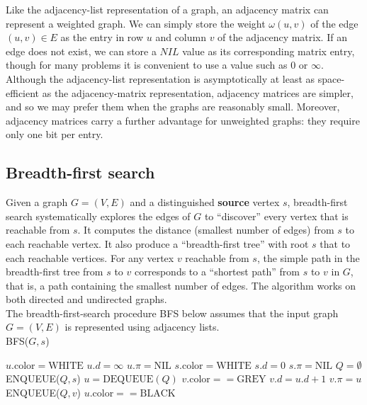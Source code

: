\documentclass[12pt]{article}
\begin{document}
Like the adjacency-list representation of a graph, an adjacency matrix can represent a weighted graph. We can simply store the weight $\omega(u,v)$ of the edge $(u,v) \in E$ as the entry in row $u$ and column $v$ of the adjacency matrix. If an edge does not exist, we can store a $NIL$ value as its corresponding matrix entry, though for many problems it is convenient to use a value such as $0$ or $\infty$. \\

Although the adjacency-list representation is asymptotically at least as space-efficient as the adjacency-matrix representation, adjacency matrices are simpler, and so we may prefer them when the graphs are reasonably small. Moreover, adjacency matrices carry a further advantage for unweighted graphs: they require only one bit per entry.

\subsection{Breadth-first search}

Given a graph $G = (V,E)$ and a distinguished \textbf{source} vertex $s$, breadth-first search systematically explores the edges of $G$ to ``discover'' every vertex that is reachable from $s$. It computes the distance (smallest number of edges) from $s$ to each reachable vertex. It also produce a ``breadth-first tree'' with root $s$ that to each reachable vertices. For any vertex $v$ reachable from $s$, the simple path in the breadth-first tree from $s$ to $v$ corresponds to a ``shortest path'' from $s$ to $v$ in $G$, that is, a path containing the smallest number of edges. The algorithm works on both directed and undirected graphs. \\

The breadth-first-search procedure BFS below assumes that the input graph $G = (V,E)$ is represented using adjacency lists. \\

BFS($G, s$)
\begin{algorithmic}[1]
	\State $u.\text{color} = \text{WHITE}$
	\State $u.d = \infty$
	\State $u.\pi = \text{NIL}$
\EndFor
\State $s.\text{color} = \text{WHITE}$
\State $s.d = 0$
\State $s.\pi = \text{NIL}$
\State $Q = \emptyset$
\State ENQUEUE($Q,s$)
	\State $u = \text{DEQUEUE}(Q)$
                	\State $v.\text{color} == \text{GREY}$
                        \State $v.d = u.d + 1$
                        \State $v.\pi = u$
                        \State ENQUEUE($Q, v$)
                \EndIf
        \EndFor
        \State $u.\text{color} == \text{BLACK}$
\EndWhile
\end{algorithmic}
\end{document}
